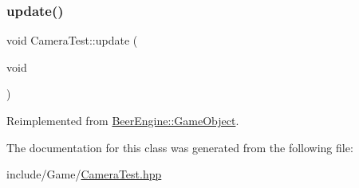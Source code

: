 \mbox{\label{class_camera_test_a5bacc3399e57aa311e8d5ea39c9865bf}} 
\subsubsection{\texorpdfstring{update()}{update()}}
{\footnotesize\ttfamily void Camera\+Test\+::update (\begin{DoxyParamCaption}\item[{void}]{ }\end{DoxyParamCaption})\hspace{0.3cm}{\ttfamily [virtual]}}



Reimplemented from \mbox{\hyperlink{class_beer_engine_1_1_game_object_ab53f4154cb5cecd0b1238465f7d1fc81}{Beer\+Engine\+::\+Game\+Object}}.



The documentation for this class was generated from the following file\+:\begin{DoxyCompactItemize}
\item 
include/\+Game/\mbox{\hyperlink{_camera_test_8hpp}{Camera\+Test.\+hpp}}\end{DoxyCompactItemize}
